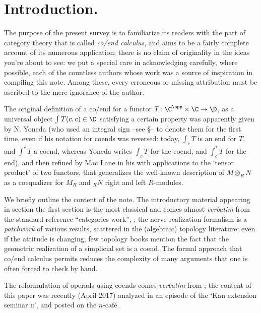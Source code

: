 \maketitle

{\small \tableofcontents}

\section*{Introduction.}
The purpose of the present survey is to familiarize its readers with the part of category theory that is called \emph{co/end calculus}, and aims to be a fairly complete account of its numerous application; there is no claim of originality in the ideas you're about to see: we put a special care in acknowledging carefully, where possible, each of the countless authors whose work was a source of inspiration in compiling this note. Among these, every erroneous or missing attribution must be ascribed to the mere ignorance of the author.

The original definition of a co/end for a functor $T\colon \C^\opp\times \C\to \D$, as a universal object $\int T(c,c)\in \D$ satisfying a certain property was apparently given by N\@. Yoneda (who used an integral sign --see §-- to denote them for the first time, even if his notation for coends was reversed: today, $\int_c T$ is an end for $T$, and $\int^c T$ a coend, whereas Yoneda writes $\int_c T$ for the coend, and $\int_c^*T$ for the end), and then refined by Mac Lane in his \cite{mac1970milgram} with applications to the `tensor product' of two functors, that generalizes the well-known description of $M\otimes_R N$ as a coequalizer for $M_R$ and ${}_RN$ right and left $R$\hyp{}modules.

We briefly outline the content of the note. The introductory material appearing in section the first section is the most classical and comes almost \emph{verbatim} from the standard reference ``categories work'', \cite{McL}; the nerve\hyp{}realization formalism is a \emph{patchwork} of various results, scattered in the (algebraic) topology literature: even if the attitude is changing, few topology books mention the fact that the geometric realization of a simplicial set is a coend. The formal approach that co/end calculus permits reduces the complexity of many arguments that one is often forced to check by hand.

The reformulation of operads using coends comes \emph{verbatim} from \cite{Kelly2005a}; the content of this paper was recently (April 2017) analyzed in an episode of the `Kan extension seminar \textsc{ii}', and posted on the $n$-café.

